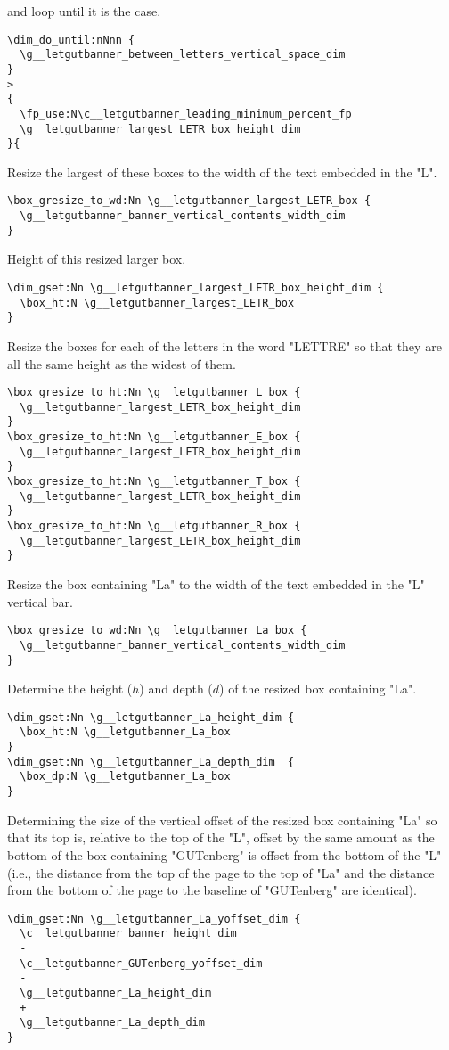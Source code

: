 \documentclass{letgut}
\begin{document}
and loop until it is the case.
\begin{lstlisting}
\dim_do_until:nNnn {
  \g__letgutbanner_between_letters_vertical_space_dim
}
>
{
  \fp_use:N\c__letgutbanner_leading_minimum_percent_fp
  \g__letgutbanner_largest_LETR_box_height_dim
}{
\end{lstlisting}
Resize the largest of these boxes to the width of the text embedded in the "L".
\begin{lstlisting}
\box_gresize_to_wd:Nn \g__letgutbanner_largest_LETR_box {
  \g__letgutbanner_banner_vertical_contents_width_dim
}
\end{lstlisting}
Height of this resized larger box.
\begin{lstlisting}
\dim_gset:Nn \g__letgutbanner_largest_LETR_box_height_dim {
  \box_ht:N \g__letgutbanner_largest_LETR_box
}
\end{lstlisting}
Resize the boxes for each of the letters in the word "LETTRE" so that they are
all the same height as the widest of them.
\begin{lstlisting}
\box_gresize_to_ht:Nn \g__letgutbanner_L_box {
  \g__letgutbanner_largest_LETR_box_height_dim
}
\box_gresize_to_ht:Nn \g__letgutbanner_E_box {
  \g__letgutbanner_largest_LETR_box_height_dim
}
\box_gresize_to_ht:Nn \g__letgutbanner_T_box {
  \g__letgutbanner_largest_LETR_box_height_dim
}
\box_gresize_to_ht:Nn \g__letgutbanner_R_box {
  \g__letgutbanner_largest_LETR_box_height_dim
}
\end{lstlisting}
Resize the box containing "La" to the width of the text embedded in the "L"
vertical bar.
\begin{lstlisting}
\box_gresize_to_wd:Nn \g__letgutbanner_La_box {
  \g__letgutbanner_banner_vertical_contents_width_dim
}
\end{lstlisting}
Determine the height (\(h\)) and depth (\(d\)) of the resized box containing "La".
\begin{lstlisting}
\dim_gset:Nn \g__letgutbanner_La_height_dim {
  \box_ht:N \g__letgutbanner_La_box
}
\dim_gset:Nn \g__letgutbanner_La_depth_dim  {
  \box_dp:N \g__letgutbanner_La_box
}
\end{lstlisting}
Determining the size of the vertical offset of the resized box containing "La"
so that its top is, relative to the top of the "L", offset by the same amount as
the bottom of the box containing "GUTenberg" is offset from the bottom of the
"L" (i.e., the distance from the top of the page to the top of "La" and the
distance from the bottom of the page to the baseline of "GUTenberg" are
identical).
\begin{lstlisting}
\dim_gset:Nn \g__letgutbanner_La_yoffset_dim {
  \c__letgutbanner_banner_height_dim
  -
  \c__letgutbanner_GUTenberg_yoffset_dim
  -
  \g__letgutbanner_La_height_dim
  +
  \g__letgutbanner_La_depth_dim
}
\end{lstlisting}
\end{document}
